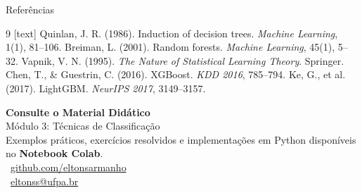 \documentclass[aspectratio=169]{beamer}
\begin{document}
\begin{frame}{Referências}
\begin{thebibliography}{9}
[text]
{\small
{} Quinlan, J. R. (1986). Induction of decision trees. \textit{Machine Learning}, 1(1), 81--106.
 Breiman, L. (2001). Random forests. \textit{Machine Learning}, 45(1), 5--32.
 Vapnik, V. N. (1995). \textit{The Nature of Statistical Learning Theory}. Springer.
 Chen, T., \& Guestrin, C. (2016). XGBoost. \textit{KDD 2016}, 785--794.
 Ke, G., et al. (2017). LightGBM. \textit{NeurIPS 2017}, 3149--3157.
}
\end{thebibliography}
\end{frame}

\begin{frame}[c]
\begin{center}
{\Large \textbf{Consulte o Material Didático}}\\[0.8em]
{\large \textcolor{mineblue}{Módulo 3: Técnicas de Classificação}}\\[1.2em]
{\normalsize Exemplos práticos, exercícios resolvidos e implementações em Python disponíveis no \textbf{Notebook Colab}.}\\[1.5em]
\faGithub\ \href{https://github.com/eltonsarmanho}{github.com/eltonsarmanho}\\[0.4em]
\faEnvelope\ \href{mailto:eltonss@ufpa.br}{eltonss@ufpa.br}
\end{center}
\end{frame}
\end{document}
